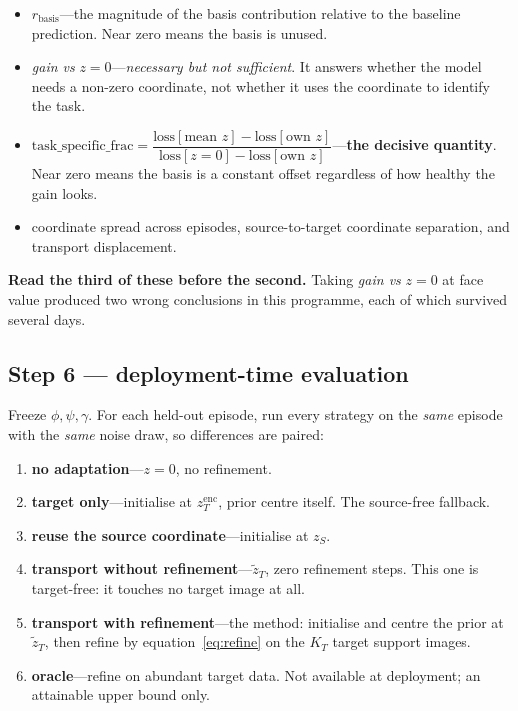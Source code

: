 \documentclass[11pt]{article}
\newcommand{\zS}{z_{S}}
\newcommand{\zencT}{z^{\mathrm{enc}}_{T}}
\newcommand{\ztilT}{\tilde{z}_{T}}
\newcommand{\KT}{K_{T}}
\begin{document}
\begin{itemize}[leftmargin=*, itemsep=3pt]
\item $r_{\text{basis}}$---the magnitude of the basis contribution relative to the baseline
      prediction. Near zero means the basis is unused.
\item \textit{gain vs} $z=0$---\emph{necessary but not sufficient}. It answers whether the model
      needs a non-zero coordinate, not whether it uses the coordinate to identify the task.
\item $\text{task\_specific\_frac} = \dfrac{\text{loss}[\text{mean }z]-\text{loss}[\text{own }z]}
      {\text{loss}[z{=}0]-\text{loss}[\text{own }z]}$---\textbf{the decisive quantity}. Near zero
      means the basis is a constant offset regardless of how healthy the gain looks.
\item coordinate spread across episodes, source-to-target coordinate separation, and transport
      displacement.
\end{itemize}

\textbf{Read the third of these before the second.} Taking \textit{gain vs} $z=0$ at face value
produced two wrong conclusions in this programme, each of which survived several days.

\subsection*{Step 6 --- deployment-time evaluation}

Freeze $\phi,\psi,\gamma$. For each held-out episode, run every strategy on the \emph{same} episode
with the \emph{same} noise draw, so differences are paired:

\begin{enumerate}[leftmargin=*, itemsep=3pt]
\item \textbf{no adaptation}---$z=0$, no refinement.
\item \textbf{target only}---initialise at $\zencT$, prior centre itself. The source-free fallback.
\item \textbf{reuse the source coordinate}---initialise at $\zS$.
\item \textbf{transport without refinement}---$\ztilT$, zero refinement steps. This one is
      target-free: it touches no target image at all.
\item \textbf{transport with refinement}---the method: initialise and centre the prior at $\ztilT$,
      then refine by equation~\eqref{eq:refine} on the $\KT$ target support images.
\item \textbf{oracle}---refine on abundant target data. Not available at deployment; an attainable
      upper bound only.
\end{enumerate}
\end{document}
